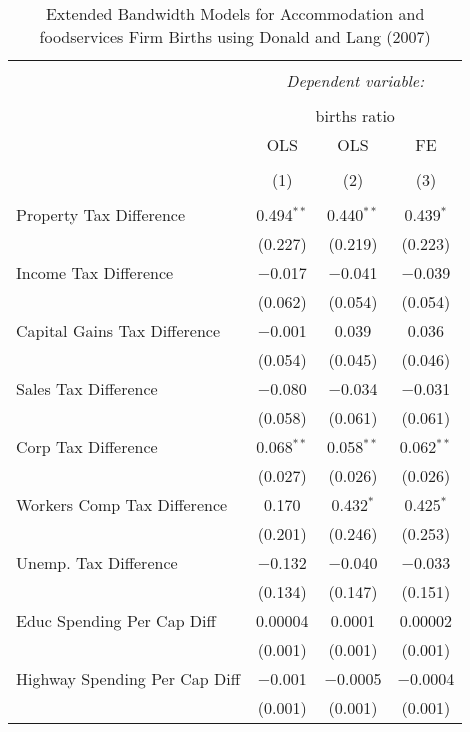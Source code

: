 
\begin{table}[!htbp] \centering 
  \caption{Extended Bandwidth Models for  Accommodation and foodservices Firm Births using Donald and Lang (2007)} 
  \label{} 
\begin{tabular}{@{\extracolsep{5pt}}lccc} 
\\[-1.8ex]\hline 
\hline \\[-1.8ex] 
 & \multicolumn{3}{c}{\textit{Dependent variable:}} \\ 
\cline{2-4} 
\\[-1.8ex] & \multicolumn{3}{c}{births ratio} \\ 
 & OLS & OLS & FE \\ 
\\[-1.8ex] & (1) & (2) & (3)\\ 
\hline \\[-1.8ex] 
 Property Tax Difference & 0.494$^{**}$ & 0.440$^{**}$ & 0.439$^{*}$ \\ 
  & (0.227) & (0.219) & (0.223) \\ 
  Income Tax Difference & $-$0.017 & $-$0.041 & $-$0.039 \\ 
  & (0.062) & (0.054) & (0.054) \\ 
  Capital Gains Tax Difference & $-$0.001 & 0.039 & 0.036 \\ 
  & (0.054) & (0.045) & (0.046) \\ 
  Sales Tax Difference & $-$0.080 & $-$0.034 & $-$0.031 \\ 
  & (0.058) & (0.061) & (0.061) \\ 
  Corp Tax Difference & 0.068$^{**}$ & 0.058$^{**}$ & 0.062$^{**}$ \\ 
  & (0.027) & (0.026) & (0.026) \\ 
  Workers Comp Tax Difference & 0.170 & 0.432$^{*}$ & 0.425$^{*}$ \\ 
  & (0.201) & (0.246) & (0.253) \\ 
  Unemp. Tax Difference & $-$0.132 & $-$0.040 & $-$0.033 \\ 
  & (0.134) & (0.147) & (0.151) \\ 
  Educ Spending Per Cap Diff & 0.00004 & 0.0001 & 0.00002 \\ 
  & (0.001) & (0.001) & (0.001) \\ 
  Highway Spending Per Cap Diff & $-$0.001 & $-$0.0005 & $-$0.0004 \\ 
  & (0.001) & (0.001) & (0.001) \\ 

\end{tabular}
\end{table}
